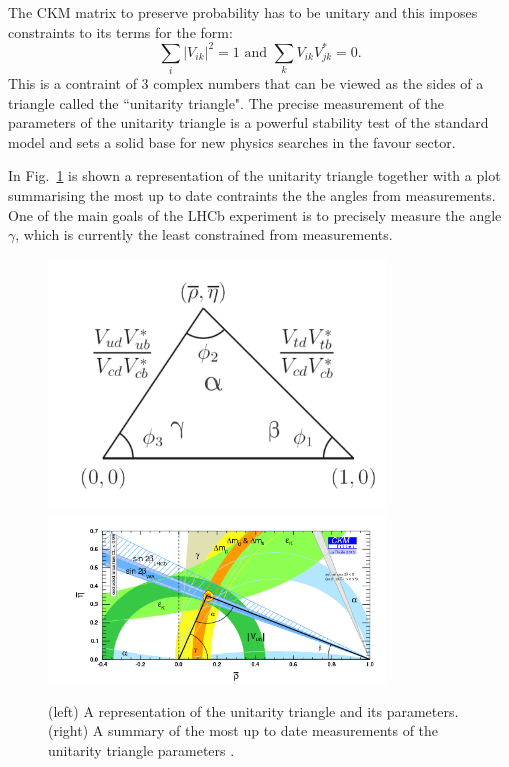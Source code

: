 The CKM matrix to preserve probability has to be unitary and this imposes constraints to its terms for the form:
\begin{equation}
\sum_i |V_{ik}|^2 = 1 \text{ and } \sum_k V_{ik} V^{*}_{jk} = 0.
\end{equation}
This is a contraint of 3 complex numbers that can be viewed as the sides of a triangle called
the ``unitarity triangle". The precise measurement of the parameters of the unitarity triangle
is a powerful stability test of the standard model and sets a solid base for new physics
searches in the favour sector.

In Fig.~\ref{fig:unitarity_triangle} is shown a representation
of the unitarity triangle together with a plot summarising the most up to date contraints
the the angles from measurements. One of the main goals of the LHCb experiment is to precisely
measure the angle $\gamma$, which is currently the least constrained from measurements.
 
 \begin{figure}[h!]
\label{fig:unitarity_triangle}
\centering 
\includegraphics[width=0.8\textwidth]{Introduction/figs/Unitarity_triangle.png}
\includegraphics[width=0.8\textwidth]{Introduction/figs/Unitarity_triangle_HFAG.png}
\caption{(left) A representation of the unitarity triangle and its parameters.
(right) A summary of the most up to date measurements of the unitarity triangle parameters \cite{}.}
\end{figure}
 
